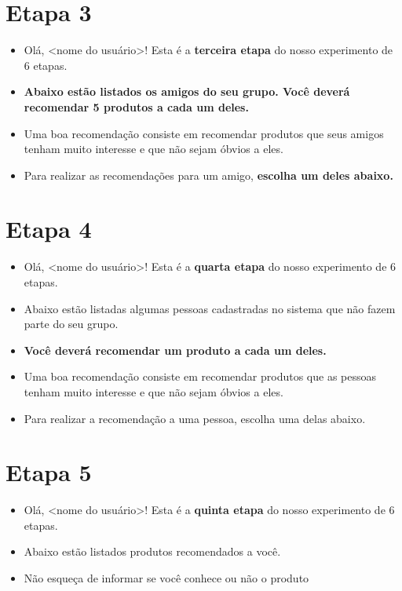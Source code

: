 
\section*{Etapa 3} %
\label{sec:c_etapa_3}
\begin{itemize}
    \item Olá, <nome do usuário>! Esta é a \textbf{terceira etapa} do nosso experimento de 6 etapas.
    \item \textbf{Abaixo estão listados os amigos do seu grupo. Você deverá recomendar 5 produtos a cada um deles.}
    \item Uma boa recomendação consiste em recomendar produtos que seus amigos tenham muito interesse e que não sejam óbvios a eles.
    \item Para realizar as recomendações para um amigo, \textbf{escolha um deles abaixo.} 
\end{itemize}      


\section*{Etapa 4} %
\label{sec:c_etapa_4}
\begin{itemize}
  \item Olá, <nome do usuário>! Esta é a \textbf{quarta etapa} do nosso experimento de 6 etapas.
  \item  Abaixo estão listadas algumas pessoas cadastradas no sistema que não fazem parte do seu grupo.
  \item \textbf{Você deverá recomendar um produto a cada um deles.}
  \item Uma boa recomendação consiste em recomendar produtos que as pessoas tenham muito interesse e que não sejam óbvios a eles. 
  \item Para realizar a recomendação a uma pessoa, escolha uma delas abaixo.
\end{itemize}

\section*{Etapa 5} %
\label{sec:c_etapa_5}
\begin{itemize}
  \item Olá, <nome do usuário>! Esta é a \textbf{quinta etapa} do nosso experimento de 6 etapas.
  \item Abaixo estão listados produtos recomendados a você.
  \item Não esqueça de informar se você conhece ou não o produto
\end{itemize}

